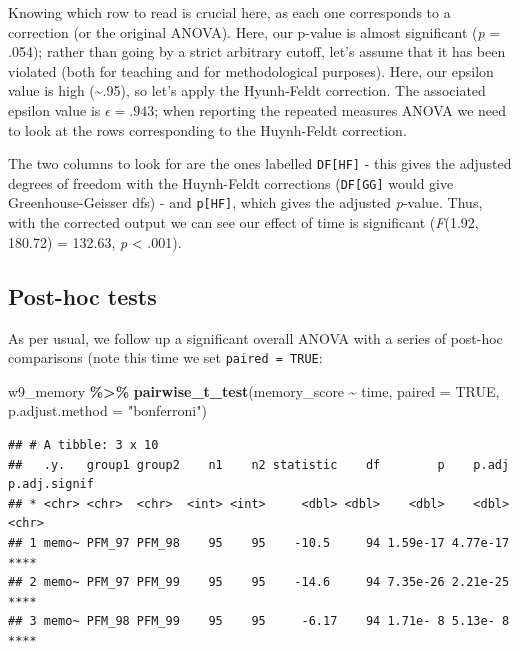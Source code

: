 \documentclass[
]{book}
\newenvironment{Shaded}{\begin{snugshade}}{\end{snugshade}}
\newcommand{\AttributeTok}[1]{\textcolor[rgb]{0.13,0.29,0.53}{#1}}
\newcommand{\ConstantTok}[1]{\textcolor[rgb]{0.56,0.35,0.01}{#1}}
\newcommand{\FunctionTok}[1]{\textcolor[rgb]{0.13,0.29,0.53}{\textbf{#1}}}
\newcommand{\NormalTok}[1]{#1}
\newcommand{\SpecialCharTok}[1]{\textcolor[rgb]{0.81,0.36,0.00}{\textbf{#1}}}
\newcommand{\StringTok}[1]{\textcolor[rgb]{0.31,0.60,0.02}{#1}}
\begin{document}
Knowing which row to read is crucial here, as each one corresponds to a correction (or the original ANOVA). Here, our p-value is almost significant (\emph{p} = .054); rather than going by a strict arbitrary cutoff, let's assume that it has been violated (both for teaching and for methodological purposes). Here, our epsilon value is high (\textasciitilde.95), so let's apply the Hyunh-Feldt correction. The associated epsilon value is \(\epsilon = .943\); when reporting the repeated measures ANOVA we need to look at the rows corresponding to the Huynh-Feldt correction.

The two columns to look for are the ones labelled \texttt{DF{[}HF{]}} - this gives the adjusted degrees of freedom with the Huynh-Feldt corrections (\texttt{DF{[}GG{]}} would give Greenhouse-Geisser dfs) - and \texttt{p{[}HF{]}}, which gives the adjusted \emph{p}-value. Thus, with the corrected output we can see our
effect of time is significant (\emph{F}(1.92, 180.72) = 132.63, \emph{p} \textless{} .001).

\subsection{Post-hoc tests}\label{post-hoc-tests-2}

As per usual, we follow up a significant overall ANOVA with a series of post-hoc comparisons (note this time we set \texttt{paired\ =\ TRUE}:

\begin{Shaded}
\begin{Highlighting}[]
\NormalTok{w9\_memory }\SpecialCharTok{\%\textgreater{}\%}
  \FunctionTok{pairwise\_t\_test}\NormalTok{(memory\_score }\SpecialCharTok{\textasciitilde{}}\NormalTok{ time, }\AttributeTok{paired =} \ConstantTok{TRUE}\NormalTok{, }\AttributeTok{p.adjust.method =} \StringTok{"bonferroni"}\NormalTok{)}
\end{Highlighting}
\end{Shaded}

\begin{verbatim}
## # A tibble: 3 x 10
##   .y.   group1 group2    n1    n2 statistic    df        p    p.adj p.adj.signif
## * <chr> <chr>  <chr>  <int> <int>     <dbl> <dbl>    <dbl>    <dbl> <chr>       
## 1 memo~ PFM_97 PFM_98    95    95    -10.5     94 1.59e-17 4.77e-17 ****        
## 2 memo~ PFM_97 PFM_99    95    95    -14.6     94 7.35e-26 2.21e-25 ****        
## 3 memo~ PFM_98 PFM_99    95    95     -6.17    94 1.71e- 8 5.13e- 8 ****
\end{verbatim}
\end{document}
